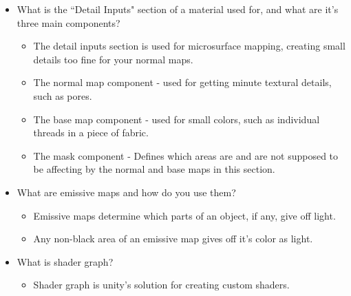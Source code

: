 \documentclass{article}
\begin{document}
\begin{itemize}
\begin{itemize}
    \end{itemize}
    \item What is the ``Detail Inputs" section of a material used for, and what are it's three main components?
    \begin{itemize}
        \item The detail inputs section is used for microsurface mapping, creating small details too fine for your normal maps.
        \item The normal map component - used for getting minute textural details, such as pores.
        \item The base map component - used for small colors, such as individual threads in a piece of fabric.
        \item The mask component - Defines which areas are and are not supposed to be affecting by the normal and base maps in this section.
    \end{itemize}
    \item What are emissive maps and how do you use them?
    \begin{itemize}
        \item Emissive maps determine which parts of an object, if any, give off light.
        \item Any non-black area of an emissive map gives off it's color as light.
    \end{itemize}
    \item What is shader graph?
    \begin{itemize}
        \item Shader graph is unity's solution for creating custom shaders.
    \end{itemize}
\end{itemize}
\end{document}
